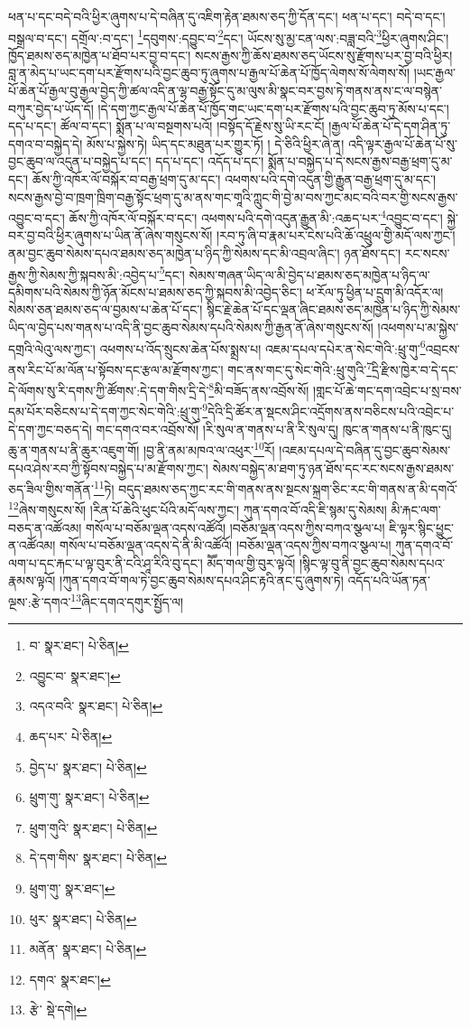 ཕན་པ་དང་བདེ་བའི་ཕྱིར་ཞུགས་པ་དེ་བཞིན་དུ་འཇིག་རྟེན་ཐམས་ཅད་ཀྱི་དོན་དང་། ཕན་པ་དང་། བདེ་བ་དང་། བསྒྲལ་བ་དང་། དགྲོལ་:བ་དང་། \footnote{བ་  སྣར་ཐང་།  པེ་ཅིན། }དབུགས་:དབྱུང་བ་\footnote{འབྱུང་བ་  སྣར་ཐང་། }དང་། ཡོངས་སུ་མྱ་ངན་ལས་:བཟླ་བའི་\footnote{འདའ་བའི་  སྣར་ཐང་།  པེ་ཅིན། }ཕྱིར་ཞུགས་ཤིང་། ཁྱོད་ཐམས་ཅད་མཁྱེན་པ་ཐོབ་པར་བྱ་བ་དང་། སངས་རྒྱས་ཀྱི་ཆོས་ཐམས་ཅད་ཡོངས་སུ་རྫོགས་པར་བྱ་བའི་ཕྱིར། བླ་ན་མེད་པ་ཡང་དག་པར་རྫོགས་པའི་བྱང་ཆུབ་ཏུ་ཞུགས་པ་རྒྱལ་པོ་ཆེན་པོ་ཁྱོད་ལེགས་སོ་ལེགས་སོ། །ཡང་རྒྱལ་པོ་ཆེན་པོ་རྒྱལ་བུ་རྒྱལ་བྱེད་ཀྱི་ཚལ་འདི་ན་ལྷ་བརྒྱ་སྟོང་དུ་མ་ལུས་མི་སྣང་བར་བྱས་ཏེ་གནས་ནས་ང་ལ་བསྙེན་བཀུར་བྱེད་པ་ཡོད་དོ། །དེ་དག་ཀྱང་རྒྱལ་པོ་ཆེན་པོ་ཁྱོད་གང་ཡང་དག་པར་རྫོགས་པའི་བྱང་ཆུབ་ཏུ་མོས་པ་དང་། དད་པ་དང་། ཚོལ་བ་དང་། སྨོན་པ་ལ་བསྔགས་པའོ། །བསྟོད་དོ་རྗེས་སུ་ཡི་རང་ངོ། །རྒྱལ་པོ་ཆེན་པོ་དེ་དག་ཤིན་ཏུ་དགའ་བ་བསྐྱེད་དེ། མོས་པ་སྐྱེས་ཏེ། ཡིད་དང་མཐུན་པར་གྱུར་ཏོ། །
དེ་ཅིའི་ཕྱིར་ཞེ་ན། འདི་ལྟར་རྒྱལ་པོ་ཆེན་པོ་སུ་བྱང་ཆུབ་ལ་འདུན་པ་བསྐྱེད་པ་དང་། དད་པ་དང་། འདོད་པ་དང་། སྨོན་པ་བསྐྱེད་པ་དེ་སངས་རྒྱས་བརྒྱ་ཕྲག་དུ་མ་དང་། ཆོས་ཀྱི་འཁོར་ལོ་བསྐོར་བ་བརྒྱ་ཕྲག་དུ་མ་དང་། འཕགས་པའི་དགེ་འདུན་གྱི་རྒྱུན་བརྒྱ་ཕྲག་དུ་མ་དང་། སངས་རྒྱས་བྱེ་བ་ཁྲག་ཁྲིག་བརྒྱ་སྟོང་ཕྲག་དུ་མ་ནས་གང་གཱའི་ཀླུང་གི་བྱེ་མ་བས་ཀྱང་མང་བའི་བར་གྱི་སངས་རྒྱས་འབྱུང་བ་དང་། ཆོས་ཀྱི་འཁོར་ལོ་བསྐོར་བ་དང་། འཕགས་པའི་དགེ་འདུན་རྒྱུན་མི་:འཆད་པར་\footnote{ཆད་པར་  པེ་ཅིན། }འབྱུང་བ་དང་། སྐྱེ་བར་བྱ་བའི་ཕྱིར་ཞུགས་པ་ཡིན་ནོ་ཞེས་གསུངས་སོ། །རབ་ཏུ་ཞི་བ་རྣམ་པར་ངེས་པའི་ཆོ་འཕྲུལ་གྱི་མདོ་ལས་ཀྱང་། ནམ་བྱང་ཆུབ་སེམས་དཔའ་ཐམས་ཅད་མཁྱེན་པ་ཉིད་ཀྱི་སེམས་དང་མི་འབྲལ་ཞིང་། ཉན་ཐོས་དང་། རང་སངས་རྒྱས་ཀྱི་སེམས་ཀྱི་སྐབས་མི་:འབྱེད་པ་\footnote{བྱེད་པ་  སྣར་ཐང་།  པེ་ཅིན། }དང་། སེམས་གཞན་ཡིད་ལ་མི་བྱེད་པ་ཐམས་ཅད་མཁྱེན་པ་ཉིད་ལ་དམིགས་པའི་སེམས་ཀྱི་ཉོན་མོངས་པ་ཐམས་ཅད་ཀྱི་སྐབས་མི་འབྱེད་ཅིང་། ཕ་རོལ་ཏུ་ཕྱིན་པ་དྲུག་མི་འདོར་ལ། སེམས་ཅན་ཐམས་ཅད་ལ་བྱམས་པ་ཆེན་པོ་དང་། སྙིང་རྗེ་ཆེན་པོ་དང་ལྡན་ཞིང་ཐམས་ཅད་མཁྱེན་པ་ཉིད་ཀྱི་སེམས་ཡིད་ལ་བྱེད་པས་གནས་པ་འདི་ནི་བྱང་ཆུབ་སེམས་དཔའི་སེམས་ཀྱི་རྒྱན་ནོ་ཞེས་གསུངས་སོ། །འཕགས་པ་མ་སྐྱེས་དགྲའི་ལེའུ་ལས་ཀྱང་། འཕགས་པ་འོད་སྲུངས་ཆེན་པོས་སྨྲས་པ། འཇམ་དཔལ་དཔེར་ན་སེང་གེའི་:ཕྲུ་གུ་\footnote{ཕྲུག་གུ་  སྣར་ཐང་།  པེ་ཅིན། }འབྲངས་ནས་རིང་པོ་མ་ལོན་པ་སྟོབས་དང་རྩལ་མ་རྫོགས་ཀྱང་། གང་ནས་གང་དུ་སེང་གེའི་:ཕྲུ་གུའི་\footnote{ཕྲུག་གུའི་  སྣར་ཐང་།  པེ་ཅིན། }དྲི་རྫིས་ཁྱེར་བ་དེ་དང་དེ་ལོགས་སུ་རི་དགས་ཀྱི་ཚོགས་:དེ་དག་གིས་དྲི་དེ་\footnote{དེ་དག་གིས་  སྣར་ཐང་།  པེ་ཅིན། }མི་བཟོད་ནས་འབྲོས་སོ། །གླང་པོ་ཆེ་གང་དག་འབྲེང་པ་སྲ་བས་དམ་པོར་བཅིངས་པ་དེ་དག་ཀྱང་སེང་གེའི་:ཕྲུ་གུ་\footnote{ཕྲུག་གུ་  སྣར་ཐང་། }དེའི་དྲི་ཚོར་ན་སྡངས་ཤིང་འདྲོགས་ནས་བཅིངས་པའི་འབྲེང་པ་དེ་དག་ཀྱང་བཅད་དེ། གང་དགའ་བར་འབྲོས་སོ། །རི་སུལ་ན་གནས་པ་ནི་རི་སུལ་དུ། ཁུང་ན་གནས་པ་ནི་ཁུང་དུ། ཆུ་ན་གནས་པ་ནི་ཆུར་འཇུག་གོ། །བྱ་ནི་ནམ་མཁའ་ལ་འཕུར་\footnote{ཕུར་  སྣར་ཐང་།  པེ་ཅིན། }རོ། །འཇམ་དཔལ་དེ་བཞིན་དུ་བྱང་ཆུབ་སེམས་དཔའ་ཤེས་རབ་ཀྱི་སྟོབས་བསྐྱེད་པ་མ་རྫོགས་ཀྱང་། སེམས་བསྐྱེད་མ་ཐག་ཏུ་ཉན་ཐོས་དང་རང་སངས་རྒྱས་ཐམས་ཅད་ཟིལ་གྱིས་གནོན་\footnote{མནོན་  སྣར་ཐང་།  པེ་ཅིན། }ཏེ། བདུད་ཐམས་ཅད་ཀྱང་རང་གི་གནས་ནས་སྔངས་སྐྲག་ཅིང་རང་གི་གནས་ན་མི་དགའོ་\footnote{དགའ་  སྣར་ཐང་། }ཞེས་གསུངས་སོ། །རིན་པོ་ཆེའི་ཕུང་པོའི་མདོ་ལས་ཀྱང་། ཀུན་དགའ་བོ་འདི་ཇི་སྙམ་དུ་སེམས། མི་རྐང་ལག་བཅད་ན་འཚོའམ། གསོལ་པ་བཅོམ་ལྡན་འདས་འཚོའོ། །བཅོམ་ལྡན་འདས་ཀྱིས་བཀའ་སྩལ་པ། ཇི་ལྟར་སྙིང་ཕྱུང་ན་འཚོའམ། གསོལ་པ་བཅོམ་ལྡན་འདས་དེ་ནི་མི་འཚོའོ། །བཅོམ་ལྡན་འདས་ཀྱིས་བཀའ་སྩལ་པ། ཀུན་དགའ་བོ་ལག་པ་དང་རྐང་པ་ལྟ་བུར་ནི་ངའི་ཤཱ་རིའི་བུ་དང་། མཽད་གལ་གྱི་བུར་ལྟའོ། །སྙིང་ལྟ་བུ་ནི་བྱང་ཆུབ་སེམས་དཔའ་རྣམས་ལྟའོ། །ཀུན་དགའ་བོ་གལ་ཏེ་བྱང་ཆུབ་སེམས་དཔའ་ཤིང་རྟའི་ནང་དུ་ཞུགས་ཏེ། འདོད་པའི་ཡོན་ཏན་ལྔས་:རྩེ་དགའ་\footnote{རྩེ་  སྡེ་དགེ། }ཞིང་དགའ་དགུར་སྤྱོད་ལ། 